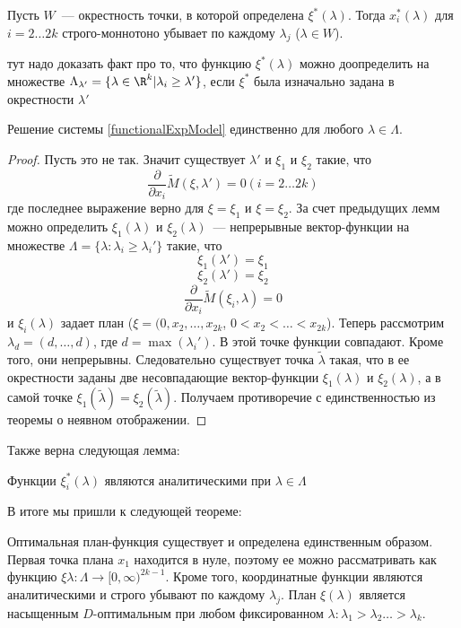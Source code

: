 \begin{lem}
Пусть $W$ — окрестность точки, в которой определена $\xi^{*}(\lambda)$. Тогда $x_{i}^{*}(\lambda)$ для $i=2…2k$ строго-моннотоно убывает по каждому $\lambda_{j}$ ($\lambda \in W$).
\end{lem}

{ \color{blue} тут надо доказать факт про то, что функцию $\xi^{*}(\lambda)$ можно доопределить на множестве $\Lambda_{\lambda'} = \{\lambda \in \R^k | \lambda_i \geq \lambda' \}$, если $\xi^{*}$ была изначально задана в окрестности $\lambda'$ }
\begin{lem}
Решение системы \eqref{functionalExpModel} единственно для любого $\lambda \in \Lambda$.
\end{lem}
\begin{proof}
Пусть это не так. Значит существует $\lambda'$ и $\xi_1$ и $\xi_2$ такие, что 
$$\frac{\partial}{\partial x_i} \tilde{M}(\xi, \lambda') = 0 (i = 2…2k)$$
где последнее выражение верно для $\xi = \xi_1$ и $\xi=\xi_2$.
За счет предыдущих лемм можно определить $\xi_1(\lambda)$ и $\xi_2(\lambda)$ — непрерывные вектор-функции на множестве $\Lambda = \{ \lambda: \lambda_i \geq\lambda_i'\}$ такие, что
$$\xi_1(\lambda')=\xi_1$$
$$\xi_2(\lambda')=\xi_2$$
$$\frac{\partial}{\partial x_i} \tilde{M}(\xi_i, \lambda) = 0$$
и $\xi_{i}(\lambda)$ задает план ($\xi = (0, x_2, …, x_{2k}$, $0 < x_2 < … < x_{2k}$).
Теперь рассмотрим $\lambda_d = (d, …, d)$, где $d = \max(\lambda_{i}')$. В этой точке функции совпадают. Кроме того, они непрерывны. Следовательно существует точка $\tilde{\lambda}$ такая, что в ее окрестности заданы две несовпадающие вектор-функции $\xi_1(\lambda)$ и $\xi_2(\lambda)$, а в самой точке $\xi_1(\tilde{\lambda}) = \xi_2(\tilde{\lambda})$. Получаем противоречие с единственностью из теоремы о неявном отображении.
\end{proof}

Также верна следующая лемма:
\begin{lem}
Функции $\xi_i^{*}(\lambda)$ являются аналитическими при $\lambda \in \Lambda$
\end{lem}

В итоге мы пришли к следующей теореме:
\begin{thm}
Оптимальная план-функция существует и определена единственным образом. Первая точка плана $x_1$ находится в нуле, поэтому ее можно рассматривать как функцию $\xi{\lambda} : \Lambda \rightarrow [0, \infty)^{2k-1}$. Кроме того, координатные функции являются аналитическими и строго убывают по каждому $\lambda_j$. План $\xi(\lambda)$ является насыщенным $D$-оптимальным при любом фиксированном $\lambda: \lambda_1 > \lambda_2 … > \lambda_k$.
\end{thm}



